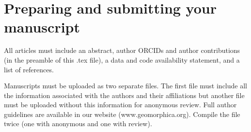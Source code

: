 \documentclass[breakmath, anonymous]{geomorphica}
\begin{document}
	
\section{Preparing and submitting your manuscript}
	
All articles must include an abstract, author ORCIDs and author contributions (in the preamble of this .tex file), a data and code availability statement, and a list of references. 

Manuscripts must be uploaded as two separate files. The first file must include all the information associated with the authors and their affiliations but another file must be uploaded without this information for anonymous review.  Full author guidelines are available in our website (www.geomorphica.org). Compile the file twice (one with anonymous and one with review). 
 
\end{document}
